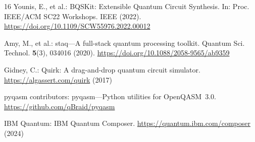 \documentclass[runningheads]{llncs}
\begin{document}
\begin{thebibliography}{16}
Younis, E., et al.: BQSKit: Extensible Quantum Circuit Synthesis.
In: Proc. IEEE/ACM SC22 Workshops. IEEE (2022).
\url{https://doi.org/10.1109/SCW55976.2022.00012}

Amy, M., et al.: staq---A full-stack quantum processing toolkit.
Quantum Sci. Technol. \textbf{5}(3), 034016 (2020).
\url{https://doi.org/10.1088/2058-9565/ab9359}

Gidney, C.: Quirk: A drag-and-drop quantum circuit simulator.
\url{https://algassert.com/quirk} (2017)

pyqasm contributors: pyqasm---Python utilities for OpenQASM~3.0.
\url{https://github.com/qBraid/pyqasm}

IBM Quantum: IBM Quantum Composer.
\url{https://quantum.ibm.com/composer} (2024)

\end{thebibliography}
\end{document}
